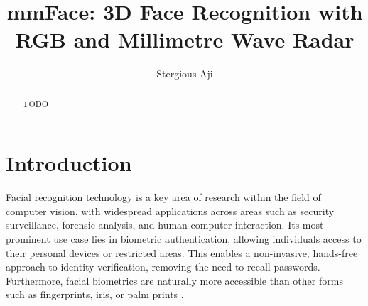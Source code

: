\documentclass{mpaper}
\begin{document}
\title{mmFace: 3D Face Recognition with RGB and Millimetre Wave Radar}
\author{Stergious Aji}

\maketitle

\begin{abstract}
    TODO


\end{abstract}



\section{Introduction}
Facial recognition technology is a key area of research within the field of computer vision, with widespread applications across areas such as security surveillance, forensic analysis, and human-computer interaction. Its most prominent use case lies in biometric authentication, allowing individuals access to their personal devices or restricted areas. This enables a non-invasive, hands-free approach to identity verification, removing the need to recall passwords. Furthermore, facial biometrics are naturally more accessible than other forms such as fingerprints, iris, or palm prints \cite{zhou20183d}.
\end{document}
